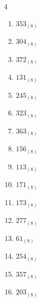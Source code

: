 \begin{multicols}{4}
\begin{enumerate}
  \item $353_{(8)}$

        \phantom{$=235$}

  \item $304_{(8)}$

        \phantom{$=196$}

  \item $372_{(8)}$

        \phantom{$=250$}

  \item $131_{(8)}$

        \phantom{$=89$}

\columnbreak %

  \item $245_{(8)}$

        \phantom{$=165$}

  \item $323_{(8)}$

        \phantom{$=211$}

  \item $363_{(8)}$

        \phantom{$=243$}

  \item $156_{(8)}$

        \phantom{$=110$}

  \item $113_{(8)}$

        \phantom{$=75$}

  \item $171_{(8)}$

        \phantom{$=121$}

  \item $173_{(8)}$

        \phantom{$=123$}

  \item $277_{(8)}$

        \phantom{$=191$}

  \item $61_{(8)}$

        \phantom{$=49$}

  \item $254_{(8)}$

        \phantom{$=172$}

  \item $357_{(8)}$

        \phantom{$=239$}

  \item $203_{(8)}$


\end{enumerate}
\end{multicols}
